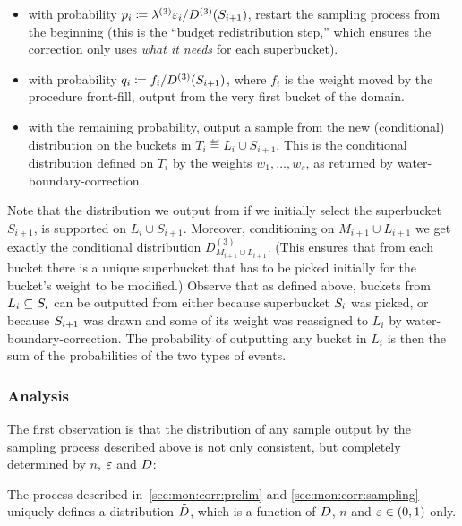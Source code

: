 \begin{itemize}
{\begin{itemize}
  \item with probability $p_i\coloneqq\lambda^{(3)}\varepsilon_i/D^{(3)}(S_{i+1})$, restart the sampling process from the beginning (this is the ``budget redistribution step,'' which ensures the correction only uses \emph{what it needs} for each superbucket).
  \item with probability  $q_i\coloneqq f_i/D^{(3)}(S_{i+1})$, where $f_i$ is the weight moved by the procedure \textsf{front-fill}, output {from} the very first {bucket} of the domain.      
    \item {with the remaining probability, output a sample from the new (conditional) distribution on the buckets in $T_i\eqdef L_i\cup S_{i+1}$. This is the conditional distribution defined {on $T_i$  by the weights $w_1,\dots, w_s$, as returned by} \textsf{water-boundary-correction}.}
  \end{itemize}
      } 
\end{itemize}
Note that the distribution we output from if we initially select the superbucket $S_{i+1}$, is supported on $L_i\cup S_{i+1}$. Moreover, conditioning on $M_{i+1}\cup L_{i+1}$ we get exactly the conditional distribution $D^{(3)}_{M_{i+1}\cup {L_{i+1}}}$. (This ensures that from each bucket there is a unique superbucket that has to be picked initially for the bucket's weight to be modified.) {Observe that as defined above, buckets from $L_i\subseteq S_i$ can be outputted from either because superbucket $S_i$ was picked, or because $S_{i+1}$ was drawn and some of its weight was reassigned to $L_i$ by \textsf{water-boundary-correction}. The probability of outputting any bucket in $L_i$ is then the sum of the probabilities of the two types of events.} 



\subsubsection{Analysis}

The first observation is that the distribution of any sample output by the sampling process described above is not only consistent, but completely determined by $n$, $\varepsilon$ and $D$:
\begin{claim}\label{lemma:correct:waterfill:defined}
The process described in~\autoref{sec:mon:corr:prelim} and \ref{sec:mon:corr:sampling} uniquely defines a distribution $\tilde{D}$, which is a function of $D$, $n$ and $\varepsilon\in(0,1)$ only.
\end{claim}

